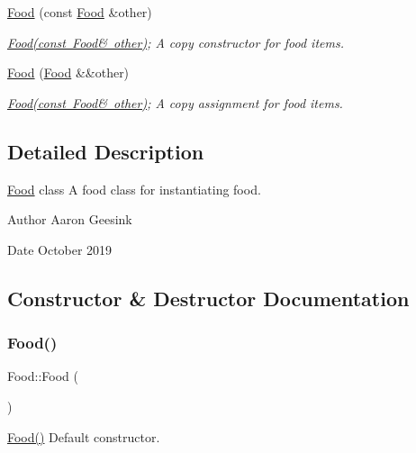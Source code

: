 \begin{DoxyCompactItemize}
\mbox{\hyperlink{class_food_a365c2d6175447d0fe29e57facc277570}{Food}} (const \mbox{\hyperlink{class_food}{Food}} \&other)
\begin{DoxyCompactList}\small\item\em \mbox{\hyperlink{class_food_a365c2d6175447d0fe29e57facc277570}{Food(const Food\& other)}}; A copy constructor for food items. \end{DoxyCompactList}\item 
\mbox{\hyperlink{class_food_a82c4dcbac6b4bb4ce921bc3aea627387}{Food}} (\mbox{\hyperlink{class_food}{Food}} \&\&other)
\begin{DoxyCompactList}\small\item\em \mbox{\hyperlink{class_food_a365c2d6175447d0fe29e57facc277570}{Food(const Food\& other)}}; A copy assignment for food items. \end{DoxyCompactList}\end{DoxyCompactItemize}


\subsection{Detailed Description}
\mbox{\hyperlink{class_food}{Food}} class A food class for instantiating food. 

\begin{DoxyAuthor}{Author}
Aaron Geesink 
\end{DoxyAuthor}
\begin{DoxyDate}{Date}
October 2019 
\end{DoxyDate}


\subsection{Constructor \& Destructor Documentation}
\mbox{\label{class_food_a75d4d7f76fd495cc8133302ca9fdc485}} 
\subsubsection{\texorpdfstring{Food()}{Food()}\hspace{0.1cm}{\footnotesize\ttfamily [1/4]}}
{\footnotesize\ttfamily Food\+::\+Food (\begin{DoxyParamCaption}{ }\end{DoxyParamCaption})}



\mbox{\hyperlink{class_food_a75d4d7f76fd495cc8133302ca9fdc485}{Food()}} Default constructor. 

